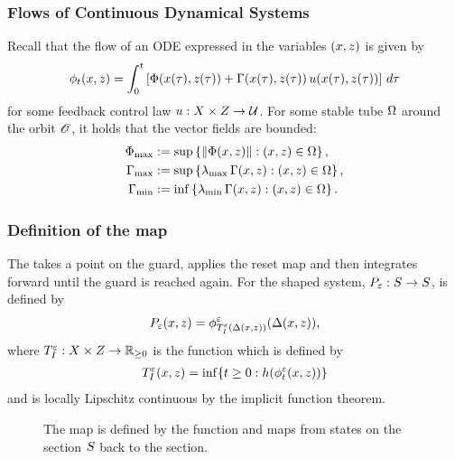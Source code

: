 \begin{frame}[t]
  \frametitle{Flows of Continuous Dynamical Systems}
  Recall that the flow of an ODE expressed in the variables $\argsxz$ is given
  by
  \begin{align*}
    \flowt\argsxz = \int_{0}^{t} \left[ \bigF\argsxztau + \bigG\argsxztau \,
      \uu\argsxztau \right] \, d\tau
  \end{align*}
  for some feedback control law $\uu : \zdX \times \zdZ \to \U$. For some stable
  tube $\stabletube$ around the orbit $\orbit$, it holds that the vector fields are bounded:
  \begin{align*}
    \supF & := \sup \left\{ \left\| \bigF\argsxz \right\| : \argsxz \in
      \stabletube \right\},\\
    \lambdamaxG &:= \sup \left\{\lambdamax\bigG\argsxz : \argsxz \in \stabletube
    \right\},\\
    \lambdaminG &:= \inf \left\{\lambdamin\bigG\argsxz : \argsxz \in \stabletube
    \right\}.
  \end{align*}
\end{frame}


\begin{frame}[t]
  \frametitle{Definition of the \Poincare{} map}
   {
    The  takes a point on the guard, applies
    the reset map and then integrates forward until the guard is reached
    again. For the shaped system, $\Pe : \S \to \S$, is defined by
    \begin{align*}
      \Pe\argsxz = \floweps_{\TIeDelta}\argsDeltaxz,
    \end{align*}
    where $\TIe : \zdX \times \zdZ \to \Rnn$ is the \tti{} function which is
    defined by
    \begin{align*}
      \TIe\argsxz = \inf \{ t \geq 0 : h(\flowepst\argsxz) \}
    \end{align*}
    and is locally Lipschitz continuous by the implicit function theorem.
  }

   {
    \begin{figure}    
      \centering
      \def\svgwidth{.78\columnwidth}
      
      \caption{The \Poincare{} map is defined by the \tti{} function and maps
        from states on the \Poincare{} section $\S$ back to the section.}
    \end{figure}
  }
\end{frame}


